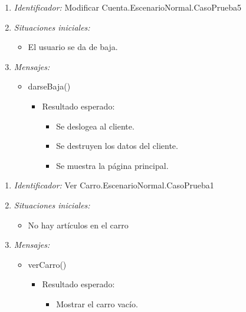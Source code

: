 \begin{enumerate}
	\item {\it Identificador:} Modificar Cuenta.EscenarioNormal.CasoPrueba5
	\item {\it Situaciones iniciales:} 
    		\begin{itemize}
    			\item El usuario se da de baja.
		\end{itemize}
	\item {\it Mensajes:}
		\begin{itemize}
			\item darseBaja()
				\begin{itemize}
					 \item Resultado esperado:
					 \begin{itemize}
					 	 \item Se deslogea al cliente.
					 	 \item Se destruyen los datos del cliente.
		       			 \item Se muestra la página principal.
					 \end{itemize}
				\end{itemize}
		\end{itemize}
\end{enumerate}


\begin{enumerate}
	\item {\it Identificador:} Ver Carro.EscenarioNormal.CasoPrueba1
	\item {\it Situaciones iniciales:}
    		\begin{itemize}
    			\item No hay artículos en el carro
		\end{itemize}
	\item {\it Mensajes:}
		\begin{itemize}
			\item verCarro()
				 \begin{itemize}
					 	\item Resultado esperado:
					 \begin{itemize}
		       			 \item Mostrar el carro vacío.
					 \end{itemize}
				 \end{itemize}
		\end{itemize}
\end{enumerate}

